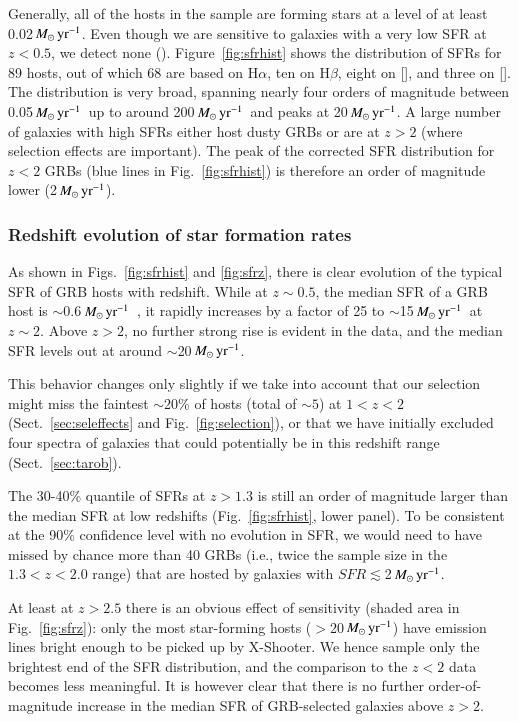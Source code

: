 \documentclass[traditabstract, longauth]{aa}
\newcommand{\hb}{H$\beta$}
\newcommand{\ha}{H$\alpha$}
\newcommand{\oii}{[\ion{O}{ii}]}
\newcommand{\oiii}{[\ion{O}{iii}]}
\newcommand{\Msunyr}{$M_\odot\,\rm{yr}^{-1}$}
\begin{document}
Generally, all of the hosts in the sample are forming stars at a level of at least 0.02\,\Msunyr. Even though we are sensitive to galaxies with a very low SFR at $z<0.5$, we detect none (\citealp[but see][for a quiescent galaxy at the position of GRB~050219A]{2014A&A...572A..47R}). Figure~\ref{fig:sfrhist} shows the distribution of SFRs for 89 hosts, out of which 68 are based on \ha, ten on \hb, eight on \oii, and three on \oiii. The distribution is very broad, spanning nearly four orders of magnitude between 0.05\,\Msunyr\, up to around 200\,\Msunyr\, and peaks at 20\,\Msunyr.  {A large number of galaxies with high SFRs either host dusty GRBs or are at $z>2$ (where selection effects are important). The peak of the corrected SFR distribution for $z<2$ GRBs (blue lines in Fig.~\ref{fig:sfrhist}) is therefore an order of magnitude lower (2\,\Msunyr).} 

\subsubsection{Redshift evolution of star formation rates}

As shown in Figs.~\ref{fig:sfrhist} and \ref{fig:sfrz}, there is clear evolution of the typical SFR of GRB hosts with redshift. While at $z\sim0.5$, the median SFR of a GRB host is $\sim0.6$\,\Msunyr\, \citep[see also][]{2009ApJ...691..182S}, it rapidly increases by a factor of 25 to $\sim$15\,\Msunyr\, at $z\sim2$. Above $z>2$, no further strong rise is evident in the data, and the median SFR levels out at around $\sim$20\,\Msunyr. 

 {This behavior changes only slightly if we take into account that our selection might miss the faintest $\sim$20\% of hosts (total of $\sim5$) at $1<z<2$ (Sect.~\ref{sec:seleffects} and Fig.~\ref{fig:selection}), or that we have initially excluded four spectra of galaxies that could potentially be in this redshift range (Sect.~\ref{sec:tarob})}. 

 {The 30-40\% quantile of SFRs at $z > 1.3$ is still an order of magnitude larger than the median SFR at low redshifts (Fig.~\ref{fig:sfrhist}, lower panel). To be consistent at the 90\% confidence level with no evolution in SFR, we would need to have missed by chance more than 40 GRBs (i.e., twice the sample size in the $1.3<z<2.0$ range) that are hosted by galaxies with $SFR\lesssim$2\,\Msunyr.}

At least at $z>2.5$ there is an obvious effect of sensitivity (shaded area in Fig.~\ref{fig:sfrz}): only the most star-forming hosts ($>$20\,\Msunyr) have emission lines bright enough to be picked up by X-Shooter. We hence sample only the brightest end of the SFR distribution, and the comparison to the $z<2$ data becomes less meaningful. It is however clear that there is no further order-of-magnitude increase in the median SFR of GRB-selected galaxies above $z > 2$. 
\end{document}
